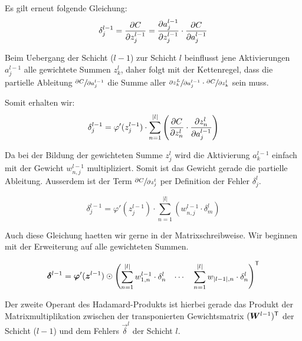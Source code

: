 \documentclass[../main]{subfiles}
\begin{document}
Es gilt erneut folgende Gleichung:
\begin{equation*}
  \delta_j^{l-1} = \frac{\partial C}{\partial z_j^{l-1}} = \frac{\partial a_j^{l-1}}{\partial z_j^{l-1}} \cdot \frac{\partial C}{\partial a_j^{l-1}}
\end{equation*}

Beim Uebergang der Schicht ($l-1$) zur Schicht $l$ beinflusst jene Aktivierungen
$a_j^{l-1}$ alle gewichtete Summen $z_k^l$, daher folgt mit der Kettenregel,
dass die partielle Ableitung $\sfrac{\partial C}{\partial a_j^{l-1}}$ die Summe aller
$\sfrac{\partial z_k^L}{\partial a_j^{l-1}} \cdot \sfrac{\partial C}{\partial z_k^l}$ sein muss.

Somit erhalten wir:
\begin{equation*}
  \delta_j^{l-1} = \varphi'(z_j^{l-1}) \cdot \sum_{n=1}^{|l|} \left( \frac{\partial C}{\partial z_n^l} \cdot \frac{\partial z_n^l}{\partial a_j^{l-1}} \right)
\end{equation*}

Da bei der Bildung der gewichteten Summe $z_j^l$ wird die Aktivierung
$a_k^{l-1}$ einfach mit der Gewicht $w_{n,j}^{l-1}$ multipliziert. Somit ist das
Gewicht gerade die partielle Ableitung. Ausserdem ist der Term
$\sfrac{\partial C}{\partial z_j^l}$ per Definition der Fehler $\delta_j^l$.

\begin{equation}\tag{BP2}
  \delta_j^{l-1} = \varphi'(z_j^{l-1}) \cdot \sum_{n=1}^{|l|} \left( w_{n,j}^{l-1} \cdot \delta_m^l \right)
\end{equation}

Auch diese Gleichung haetten wir gerne in der Matrixschreibweise. Wir beginnen
mit der Erweiterung auf alle gewichteten Summen.

\begin{equation*}
  \bm{\delta}^{l-1} = \bm{\varphi}'(\bm{z}^{l-1}) \odot \begin{pmatrix} \displaystyle\sum_{n=1}^{|l|} w_{1,n}^{l-1} \cdot \delta_n^l & \cdots & \displaystyle\sum_{n=1}^{|l|} w_{|l-1|,n} \cdot \delta_n^l \end{pmatrix}^{\mathsf{T}}
\end{equation*}

Der zweite Operant des Hadamard-Produkts ist hierbei gerade das Produkt der
Matrixmultiplikation zwischen
der transponierten Gewichtsmatrix $(\bm{W}^{l-1})^{\mathsf{T}}$ der Schicht ($l-1$)
und dem Fehlers $\vec{\delta}^l$ der Schicht $l$.
\end{document}
